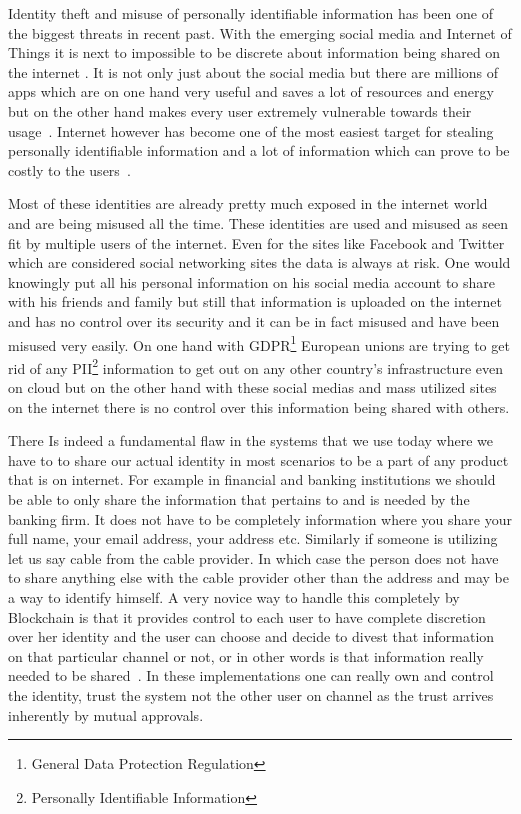 Identity theft and misuse of personally identifiable information has
been one of the biggest threats in recent past. With the emerging
social media and Internet of Things it is next to impossible to be
discrete about information being shared on the internet
\cite{reuters20}. It is not only just about the social media but there
are millions of apps which are on one hand very useful and saves a lot
of resources and energy but on the other hand makes every user
extremely vulnerable towards their usage~\cite{statista21}. Internet
however has become one of the most easiest target for stealing
personally identifiable information and a lot of information which can
prove to be costly to the users~\cite{hedayati22}.

Most of these identities are already pretty much exposed in the
internet world and are being misused all the time. These identities
are used and misused as seen fit by multiple users of the internet.
Even for the sites like Facebook and Twitter which are considered
social networking sites the data is always at risk. One would
knowingly put all his personal information on his social media account
to share with his friends and family but still that information is
uploaded on the internet and has no control over its security and it
can be in fact misused and have been misused very easily. On one hand
with GDPR\footnote{General Data Protection Regulation} European unions
are trying to get rid of any PII\footnote{Personally Identifiable
  Information} information to get out on any other country's
infrastructure even on cloud but on the other hand with these social
medias and mass utilized sites on the internet there is no control over
this information being shared with others.


There Is indeed a fundamental flaw in the systems that we use today
where we have to to share our actual identity in most scenarios to be
a part of any product that is on internet. For example in financial
and banking institutions we should be able to only share the
information that pertains to and is needed by the banking firm. It
does not have to be completely information where you share your full
name, your email address, your address etc. Similarly if someone is
utilizing let us say cable from the cable provider. In which case the
person does not have to share anything else with the cable provider
other than the address and may be a way to identify himself. A very
novice way to handle this completely by Blockchain is that it provides
control to each user to have complete discretion over her identity and
the user can choose and decide to divest that information on that
particular channel or not, or in other words is that information
really needed to be shared~\cite{alex23}. In these implementations one
can really own and control the identity, trust the system not the
other user on channel as the trust arrives inherently by mutual
approvals.


